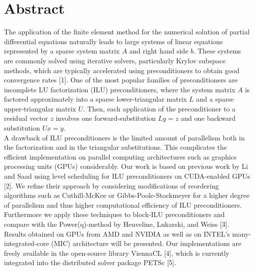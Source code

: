 \documentclass[article,A4,11pt]{llncs}%
\begin{document}
\section*{Abstract}
The application of the finite element method for the numerical solution of partial differential equations naturally leads to
large systems of linear equations represented by a sparse system matrix $A$ and right hand side $b$. These systems are commonly solved using iterative solvers, particularly Krylov subspace methods, which are typically accelerated using preconditioners to obtain good convergence rates [1]. One of the most popular families of preconditioners are incomplete LU factorization (ILU) preconditioners, where the system matrix $A$ is factored approximately into a sparse lower-triangular matrix $L$ and a sparse upper-triangular matrix $U$. Then, each application of the preconditioner to a residual vector $z$ involves one forward-substitution $Ly = z$ and one backward substitution $Ux = y$. \\

A drawback of ILU preconditioners is the limited amount of parallelism both in the factorization and in the triangular substitutions. This complicates the efficient implementation on parallel computing architectures such as graphics processing units (GPUs) considerably. Our work is based on previous work by Li and Saad using level scheduling for ILU preconditioners on CUDA-enabled GPUs [2]. We refine their approach by considering modifications of reordering algorithms such as Cuthill-McKee or Gibbs-Poole-Stockmeyer for a higher degree of parallelism and thus higher computational efficiency of ILU preconditioners. Furthermore we apply these techniques to block-ILU preconditioners and compare with the Power(q)-method by Heuveline, Lukarski, and Weiss [3]. Results obtained on GPUs from AMD and NVIDIA as well as on INTEL's many-integrated-core (MIC) architecture will be presented. Our implementations are freely available in the open-source library ViennaCL [4], which is currently integrated into the distributed solver package PETSc [5].
\end{document}
